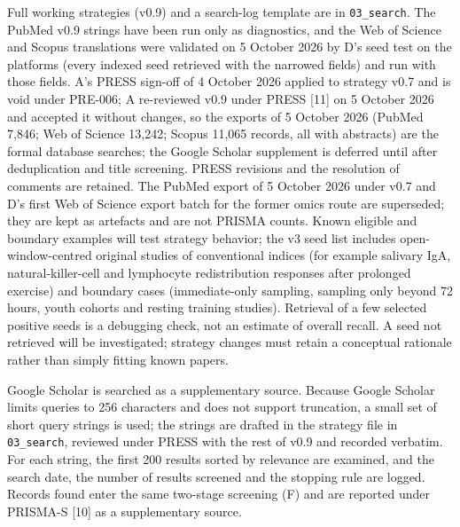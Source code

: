\documentclass[
  11pt,
  a4paper,
]{article}
\begin{document}
Full working strategies (v0.9) and a search-log template are in
\texttt{03\_search}. The PubMed v0.9 strings have been run only as
diagnostics, and the Web of Science and Scopus translations were
validated on 5 October 2026 by D's seed test on the platforms (every
indexed seed retrieved with the narrowed fields) and run with those
fields. A's PRESS sign-off of 4 October 2026 applied to strategy v0.7
and is void under PRE-006; A re-reviewed v0.9 under PRESS {[}11{]} on 5
October 2026 and accepted it without changes, so the exports of 5
October 2026 (PubMed 7,846; Web of Science 13,242; Scopus 11,065
records, all with abstracts) are the formal database searches; the
Google Scholar supplement is deferred until after deduplication and
title screening. PRESS revisions and the resolution of comments are
retained. The PubMed export of 5 October 2026 under v0.7 and D's first
Web of Science export batch for the former omics route are superseded;
they are kept as artefacts and are not PRISMA counts. Known eligible and
boundary examples will test strategy behavior; the v3 seed list includes
open-window-centred original studies of conventional indices (for
example salivary IgA, natural-killer-cell and lymphocyte redistribution
responses after prolonged exercise) and boundary cases (immediate-only
sampling, sampling only beyond 72 hours, youth cohorts and resting
training studies). Retrieval of a few selected positive seeds is a
debugging check, not an estimate of overall recall. A seed not retrieved
will be investigated; strategy changes must retain a conceptual
rationale rather than simply fitting known papers.

Google Scholar is searched as a supplementary source. Because Google
Scholar limits queries to 256 characters and does not support
truncation, a small set of short query strings is used; the strings are
drafted in the strategy file in \texttt{03\_search}, reviewed under
PRESS with the rest of v0.9 and recorded verbatim. For each string, the
first 200 results sorted by relevance are examined, and the search date,
the number of results screened and the stopping rule are logged. Records
found enter the same two-stage screening (F) and are reported under
PRISMA-S {[}10{]} as a supplementary source.
\end{document}
